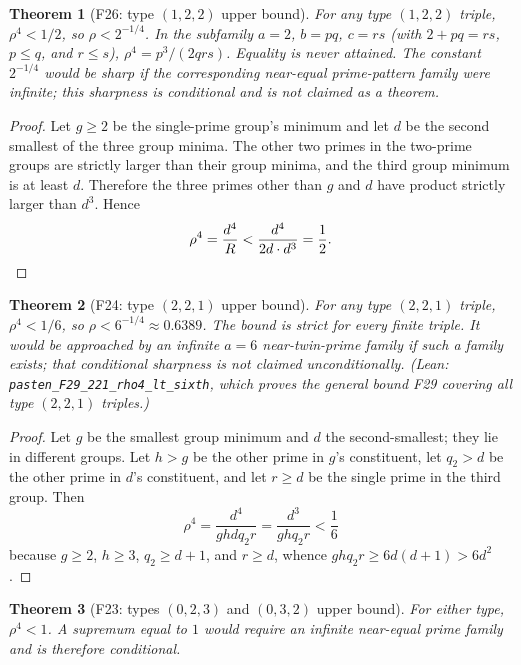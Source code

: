 \documentclass[12pt]{article}
\newtheorem{theorem}{Theorem}
\theoremstyle{definition}
\begin{document}
\begin{theorem}[F26: type $(1,2,2)$ upper bound]\label{thm:f26}
For any type $(1,2,2)$ triple, $\rho^4<1/2$, so $\rho<2^{-1/4}$.
In the subfamily $a=2$, $b=pq$, $c=rs$ (with $2+pq=rs$, $p\le q$, and
$r\le s$), $\rho^4=p^3/(2qrs)$.  Equality is never attained.  The constant
$2^{-1/4}$ would be sharp if the corresponding near-equal prime-pattern family
were infinite; this sharpness is conditional and is not claimed as a theorem.
\end{theorem}

\begin{proof}
Let $g\ge2$ be the single-prime group's minimum and let $d$ be the second
smallest of the three group minima.  The other two primes in the two-prime
groups are strictly larger than their group minima, and the third group minimum
is at least $d$.  Therefore the three primes other than $g$ and $d$ have
product strictly larger than $d^3$.  Hence
\[
  \rho^4=\frac{d^4}{R}
  <\frac{d^4}{2d\cdot d^3}
  =\frac12. \qedhere
\]
\end{proof}

\begin{theorem}[F24: type $(2,2,1)$ upper bound]\label{thm:f24}
For any type $(2,2,1)$ triple, $\rho^4<1/6$, so
$\rho<6^{-1/4}\approx0.6389$.  The bound is strict for every finite triple.
It would be approached by an infinite $a=6$ near-twin-prime family if such a
family exists; that conditional sharpness is not claimed unconditionally.
(Lean: \texttt{pasten\_F29\_221\_rho4\_lt\_sixth}, which proves the general bound F29 covering all type $(2,2,1)$ triples.)
\end{theorem}

\begin{proof}
Let $g$ be the smallest group minimum and $d$ the second-smallest; they lie in
different groups.  Let $h>g$ be the other prime in $g$'s constituent, let
$q_2>d$ be the other prime in $d$'s constituent, and let $r\ge d$ be the
single prime in the third group.  Then
\[
  \rho^4=\frac{d^4}{g h d q_2 r}
  =\frac{d^3}{g h q_2 r}
  <\frac16
\]
because $g\ge2$, $h\ge3$, $q_2\ge d+1$, and $r\ge d$, whence
$g h q_2 r\ge6d(d+1)>6d^2$.
\end{proof}

\begin{theorem}[F23: types $(0,2,3)$ and $(0,3,2)$ upper bound]\label{thm:f23}
For either type, $\rho^4<1$.  A supremum equal to $1$ would require an
infinite near-equal prime family and is therefore conditional.
\end{theorem}
\end{document}

